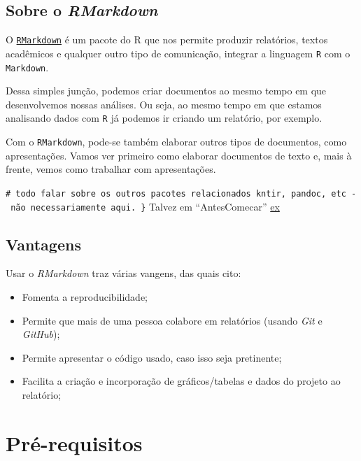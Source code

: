 \documentclass[]{book}
\providecommand{\tightlist}{%
  \setlength{\itemsep}{0pt}\setlength{\parskip}{0pt}}
\begin{document}
\hypertarget{rmarkdown}{%
\section{\texorpdfstring{Sobre o \emph{RMarkdown}}{Sobre o RMarkdown}}\label{rmarkdown}}

O \href{https://rmarkdown.rstudio.com/}{\texttt{RMarkdown}} é um pacote do R que nos permite produzir relatórios, textos acadêmicos e qualquer outro tipo de comunicação, integrar a linguagem \texttt{R} com o \texttt{Markdown}.

Dessa simples junção, podemos criar documentos ao mesmo tempo em que desenvolvemos nossas análises. Ou seja, ao mesmo tempo em que estamos analisando dados com \texttt{R} já podemos ir criando um relatório, por exemplo.

Com o \texttt{RMarkdown}, pode-se também elaborar outros tipos de documentos, como apresentações. Vamos ver primeiro como elaborar documentos de texto e, mais à frente, vemos como trabalhar com apresentações.

\texttt{\#\ todo\ falar\ sobre\ os\ outros\ pacotes\ relacionados\ kntir,\ pandoc,\ etc\ -\ não\ necessariamente\ aqui.\ \}} Talvez em ``AntesComecar''
\href{https://bookdown.org/yihui/bookdown/pandoc.html}{ex}

\hypertarget{vantagens}{%
\section{Vantagens}\label{vantagens}}

Usar o \emph{RMarkdown} traz várias vangens, das quais cito:

\begin{itemize}
\tightlist
\item
  Fomenta a reproducibilidade;\\
\item
  Permite que mais de uma pessoa colabore em relatórios (usando \emph{Git} e \emph{GitHub});\\
\item
  Permite apresentar o código usado, caso isso seja pretinente;\\
\item
  Facilita a criação e incorporação de gráficos/tabelas e dados do projeto ao relatório;
\end{itemize}

\hypertarget{pruxe9-requisitos}{%
\chapter{Pré-requisitos}\label{pruxe9-requisitos}}
\end{document}

